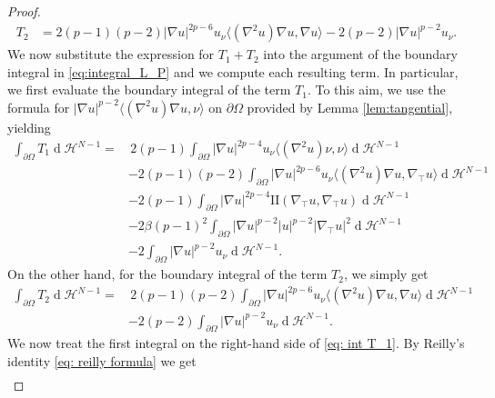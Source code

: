 \documentclass[10pt,a4paper]{amsart}
\numberwithin{equation}{section}
\renewcommand{\d}[1]{\ensuremath{\operatorname{d}\!{#1}}}
\begin{document}
\begin{proof}
\begin{equation*}
\begin{aligned}
        T_2 &= 2(p-1)(p-2)|\nabla u|^{2p-6} u_\nu \langle (\nabla^2 u)\nabla u, \nabla u \rangle - 2(p-2) |\nabla u|^{p-2} u_\nu.
        \end{aligned}
    \end{equation*}
    We now substitute the expression for $T_1+T_2$ into the argument of the boundary integral in \eqref{eq:integral_L_P} and we compute each resulting term. In particular, we first evaluate the boundary integral of the term $T_1$. To this aim, we use the formula for $|\nabla u|^{p-2}\langle(\nabla^2u)\nabla u,\nu\rangle$ on $\partial\Omega$ provided by Lemma \ref{lem:tangential}, yielding
    \begin{equation}\label{eq: int T_1}
        \begin{aligned}
            \int_{\partial\Omega} T_1 \d{}\mathcal{H}^{N-1} =& \,2(p-1)\int_{\partial\Omega}|\nabla u|^{2p-4} u_\nu \langle(\nabla^2u)\nu,\nu\rangle\d{}\mathcal{H}^{N-1}\\
            &-2(p-1)(p-2)\int_{\partial\Omega}|\nabla u|^{2p-6} u_\nu \langle(\nabla^2u)\nabla u,\nabla_\top u\rangle\d{}\mathcal{H}^{N-1}\\
            &-2(p-1)\int_{\partial\Omega}|\nabla u|^{2p-4} \mathrm{I\!I}(\nabla_\top u,\nabla_\top u) \d{}\mathcal{H}^{N-1}\\
            &-2\beta(p-1)^2\int_{\partial\Omega}|\nabla u|^{p-2}|u|^{p-2}|\nabla_\top u|^{2}\d{}\mathcal{H}^{N-1}\\
            &-2\int_{\partial\Omega}|\nabla u|^{p-2} u_\nu \d{}\mathcal{H}^{N-1}.
        \end{aligned}
    \end{equation}
    On the other hand, for the boundary integral of the term $T_2$, we simply get
    \begin{equation}\label{eq: int T_2}
        \begin{aligned}
        \int_{\partial\Omega} T_2 \d{}\mathcal{H}^{N-1} =
        & \, 2(p-1)(p-2)\int_{\partial\Omega}|\nabla u|^{2p-6} u_\nu \langle(\nabla^2u)\nabla u,\nabla u\rangle\d{}\mathcal{H}^{N-1}\\
        &-2(p-2)\int_{\partial\Omega}|\nabla u|^{p-2} u_\nu \d{}\mathcal{H}^{N-1}.
        \end{aligned}
    \end{equation}
    We now treat the first integral on the right-hand side of \eqref{eq: int T_1}. By Reilly's identity \eqref{eq: reilly formula} we get 
    \begin{equation*}
        \begin{aligned}

\end{aligned}
\end{equation*}
\end{proof}
\end{document}
